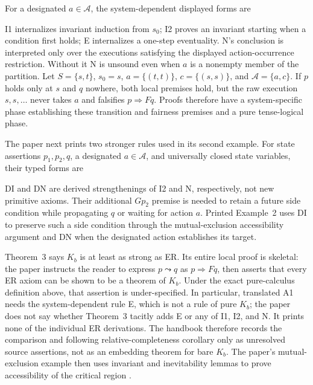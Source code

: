 For a designated \(a\in\mathcal A\), the system-dependent displayed forms are
\par\noindent
\begin{minipage}{\linewidth}
\end{minipage}
\par
I1 internalizes invariant induction from \(s_0\); I2 proves an invariant
starting when a condition first holds; E internalizes a one-step eventuality.
N's conclusion is interpreted only over the executions satisfying the
displayed action-occurrence restriction.  Without it N is unsound even when
\(a\) is a nonempty member of the partition.  Let
\(S=\{s,t\}\), \(s_0=s\),
\(a=\{(t,t)\}\), \(c=\{(s,s)\}\), and
\(\mathcal A=\{a,c\}\).  If \(p\) holds only at \(s\) and \(q\) nowhere,
both local premises hold, but the raw execution
\(s,s,\ldots\) never takes \(a\) and falsifies \(p\Rightarrow Fq\).
Proofs therefore have a
system-specific phase establishing these transition and fairness premises and
a pure tense-logical phase.

The paper next prints two stronger rules used in its second example.  For state
assertions \(p_1,p_2,q\), a designated \(a\in\mathcal A\), and universally
closed state variables, their typed forms are
\par\noindent
\begin{minipage}{\linewidth}
\end{minipage}
\par
\par\noindent
\begin{minipage}{\linewidth}
\end{minipage}
\par
DI and DN are derived strengthenings of I2 and N, respectively, not new
primitive axioms.  Their additional \(Gp_2\) premise is needed to retain a
future side condition while propagating \(q\) or waiting for action \(a\).
Printed Example~2 uses DI to preserve such a side condition through the
mutual-exclusion accessibility argument and DN when the designated action
establishes its target.

Theorem~3 says \(K_b\) is at least as strong as ER.  Its entire local proof is
skeletal: the paper instructs the reader to express \(p\leadsto q\) as
\(p\Rightarrow Fq\), then asserts that every ER axiom can be shown to be a
theorem of \(K_b\).  Under the exact pure-calculus definition above, that
assertion is under-specified.  In particular, translated A1 needs the
system-dependent rule E, which is not a rule of pure \(K_b\); the paper does
not say whether Theorem~3 tacitly adds E or any of I1, I2, and N.  It prints
none of the individual ER derivations.  The handbook therefore records the
comparison and following relative-completeness corollary only as unresolved
source assertions, not as an embedding theorem for bare \(K_b\).  The paper's
mutual-exclusion example then uses invariant and inevitability lemmas to prove
accessibility of the critical region
\cite[pp.~53--55]{Pnueli1977}.

